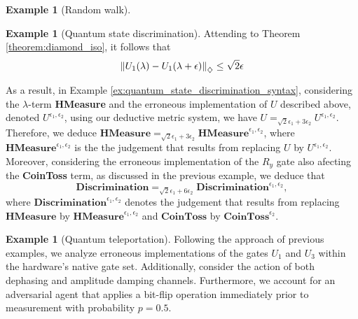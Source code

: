\documentclass[10pt,a4paper]{amsart}
\theoremstyle{definition}
\theoremstyle{definition}
\newtheorem{example}[definition]{Example}
\theoremstyle{definition}
\theoremstyle{definition}
\theoremstyle{definition}
\theoremstyle{definition}
\begin{document}
\begin{example}[Random walk]
\begin{example}[Quantum state discrimination]
Attending to Theorem \ref{theorem:diamond_iso}, it follows that
  \begin{align*}
    \left\lVert U_1(\lambda)- U_1(\lambda + \epsilon)  \right\rVert_{\diamondsuit} \leq \sqrt{2} \epsilon
  \end{align*}


As a result, in  Example \ref{ex:quantum_state_discrimination_syntax}, considering the $\lambda$-term \textbf{HMeasure} and the erroneous implementation of $U$ described above, denoted $U^{\epsilon_1, \epsilon_2}$, using our deductive metric system, we have $U =_{\sqrt{2}\epsilon_1+ 3\epsilon_2} U^{\epsilon_1, \epsilon_2}$. Therefore, we deduce $\textbf{HMeasure} =_{\sqrt{2}\epsilon_1+ 3\epsilon_2} \textbf{HMeasure}^{\epsilon_1, \epsilon_2}$, where $\textbf{HMeasure}^{\epsilon_1, \epsilon_2}$ is the the judgement that results from replacing $U$ by $U^{\epsilon_1, \epsilon_2}$. Moreover, considering the erroneous implementation of the $R_y$ gate also afecting the \textbf{CoinToss} term, as discussed in the previous example, we deduce that 
$$\textbf{Discrimination} =_{\sqrt{2}\epsilon_1+6\epsilon_2} \textbf{Discrimination}^{\epsilon_1,\epsilon_2}, $$
where $\textbf{Discrimination}^{\epsilon_1,\epsilon_2}$ denotes the judgement that results from replacing $\textbf{HMeasure}$ by $\textbf{HMeasure}^{\epsilon_1, \epsilon_2}$ and $\textbf{CoinToss}$ by  $\textbf{CoinToss}^{\epsilon_2}$.

\end{example}

  \begin{example}[Quantum teleportation]


    Following the approach of previous examples, we analyze erroneous implementations of the gates $U_1$ and $U_3$ within the hardware’s native gate set. Additionally, consider the action of both dephasing and amplitude damping channels. Furthermore, we account for an adversarial agent that applies a bit-flip operation immediately prior to measurement with probability $ p = 0.5 $.  


\end{example}
\end{example}
\end{document}
